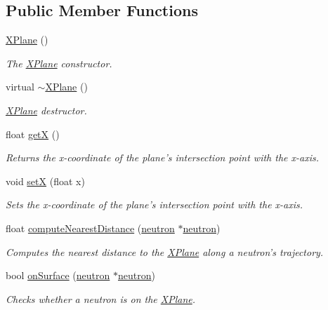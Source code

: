 \subsection*{Public Member Functions}
\begin{DoxyCompactItemize}
\item 
\hyperlink{classXPlane_a0bfa015e8f955be0eef4cfd00f9d81f5}{X\-Plane} ()
\begin{DoxyCompactList}\small\item\em The \hyperlink{classXPlane}{X\-Plane} constructor. \end{DoxyCompactList}\item 
\hypertarget{classXPlane_ada639dc05191d98fc5010a92f47dd105}{virtual \hyperlink{classXPlane_ada639dc05191d98fc5010a92f47dd105}{$\sim$\-X\-Plane} ()}\label{classXPlane_ada639dc05191d98fc5010a92f47dd105}

\begin{DoxyCompactList}\small\item\em \hyperlink{classXPlane}{X\-Plane} destructor. \end{DoxyCompactList}\item 
float \hyperlink{classXPlane_a7dc0803dc4f83aab3de306f4b70a097c}{get\-X} ()
\begin{DoxyCompactList}\small\item\em Returns the x-\/coordinate of the plane's intersection point with the x-\/axis. \end{DoxyCompactList}\item 
void \hyperlink{classXPlane_aad3f4f68ce1cac31589ee00244e30f64}{set\-X} (float x)
\begin{DoxyCompactList}\small\item\em Sets the x-\/coordinate of the plane's intersection point with the x-\/axis. \end{DoxyCompactList}\item 
float \hyperlink{classXPlane_a4370395de84303e337c12457b862753a}{compute\-Nearest\-Distance} (\hyperlink{structneutron}{neutron} $\ast$\hyperlink{structneutron}{neutron})
\begin{DoxyCompactList}\small\item\em Computes the nearest distance to the \hyperlink{classXPlane}{X\-Plane} along a neutron's trajectory. \end{DoxyCompactList}\item 
bool \hyperlink{classXPlane_aba1824906b2f6ed732646385cb3cb98c}{on\-Surface} (\hyperlink{structneutron}{neutron} $\ast$\hyperlink{structneutron}{neutron})
\begin{DoxyCompactList}\small\item\em Checks whether a neutron is on the \hyperlink{classXPlane}{X\-Plane}. \end{DoxyCompactList}\end{DoxyCompactItemize}
